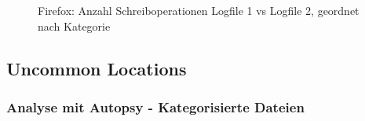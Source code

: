 \begin{appendices}
\begin{figure}[h!]
			\caption{Firefox: Anzahl Schreiboperationen Logfile 1 vs Logfile 2, geordnet nach Kategorie}
			\label{chart:firefox-writefile-logfile1v2}
		\end{figure}
		
		
		\subsection{Uncommon Locations}
		\label{subsection:appendix-firefox-uncommon-locations}
		
		\subsubsection*{Analyse mit Autopsy - Kategorisierte Dateien}
		\label{subsubsection:appendix-firefox-uncommon-locations-autopsy}
		

\end{appendices}
